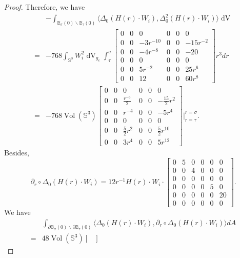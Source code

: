 \documentclass[11pt,letterpaper]{amsart}
\DeclareMathOperator{\Vol}{Vol}
\DeclareMathOperator{\dvol}{dV}
\newcommand{\bB}{\mathbb{B}}
\newcommand{\bS}{\mathbb{S}}
\theoremstyle{definition}
\theoremstyle{remark}
\numberwithin{equation}{section}
\begin{document}
\begin{proof}
Therefore, we have
\begin{equation}
\begin{split}
    &-\int_{\bB_{\sigma}(0)\backslash \bB_{\tau}(0)}\langle \Delta_0 (H(r)\cdot W_i), \Delta^2_0(H(r)\cdot W_i)\rangle \dvol\\
=&-768\int_{\bS^3} W^2_i\dvol_{g_c}\int_{\tau}^{\sigma}\begin{bmatrix}
0 & 0 & 0 & 0 & 0& 0\\
0 & 0 & -3r^{-10} & 0 & 0& -15r^{-2}\\
0 & 0 & -4r^{-8} & 0 & 0& -20\\
0 & 0 & 0 & 0 & 0& 0\\
0 & 0 & 5r^{-2} & 0 & 0& 25r^6\\
0 & 0 & 12 & 0 & 0 & 60r^8
\end{bmatrix}r^3dr\\
=&-768\Vol(\bS^3) \begin{bmatrix}
0 & 0 & 0 & 0 & 0& 0\\
0 & 0 & \frac{r^{-6}}{2} & 0 & 0& -\frac{15}{2}r^{2}\\
0 & 0 & r^{-4} & 0 & 0& -5r^4\\
0 & 0 & 0 & 0 & 0& 0\\
0 & 0 & \frac{5}{2}r^2 & 0 & 0& \frac{5}{2}r^{10}\\
0 & 0 & 3r^4 & 0 & 0 & 5r^{12}
\end{bmatrix}\Bigg|_{r=\tau}^{r=\sigma}.
    \end{split}
\end{equation}
Besides,
\begin{equation}
    \partial_r \circ \Delta_0(H(r)\cdot W_i)=12 r^{-1} H(r)\cdot W_i\cdot 
    \begin{bmatrix}
0 & 5 & 0 & 0 & 0& 0\\
0 & 0 & 4 & 0 & 0& 0\\
0 & 0 & 0 & 0 & 0& 0\\
0 & 0 & 0 & 0 & 5& 0\\
0 & 0 & 0 & 0 & 0& 20\\
0 & 0 & 0 & 0 & 0& 0
\end{bmatrix}.
\end{equation}
We have
\begin{equation}
\begin{split}
    &\int_{\partial \bB_{\sigma}(0)\backslash \partial \bB_{\tau}(0)} \langle \Delta_0(H(r)\cdot W_i), \partial_r \circ \Delta_0(H(r)\cdot W_i) \rangle dA\\
    =&48 \Vol(\bS^3) \begin{bmatrix}

\end{bmatrix}
\end{split}
\end{equation}
\end{proof}
\end{document}
